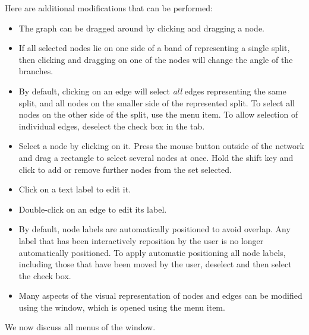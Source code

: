 \documentclass[11pt]{article}
\begin{document}
Here are additional modifications that can be performed:
\begin{itemize}
\item The graph can be dragged around by clicking and dragging a node.
\item If all selected nodes lie on one side of a band of
 representing a single split, then clicking and
dragging on one of the nodes will change
the angle of the branches.
\item
By default, clicking on an edge will select {\em all}
edges representing the same
split, and all nodes on the smaller side of the represented split.
To select all nodes on the other side of the split,
use the  menu item.
To allow selection of individual edges,
deselect the  check box in the
 tab.
\item Select a node by clicking on it. Press the mouse button
  outside of the network and drag  a
rectangle to select several nodes at once. Hold the shift key and click to add
or remove further nodes from the set selected.
\item Click on a text label to edit it.
\item Double-click on an edge to edit its label.
\item By default, node labels are automatically positioned to avoid overlap.  Any label that has been interactively reposition by the user is no longer automatically positioned.
To apply automatic positioning all node labels, including those that have been
moved by the user, deselect and then select
the  check box.
\item Many aspects of the visual representation of nodes and edges can be
modified
using the  window, which is opened using the
 menu item.
\end{itemize}


We now discuss all menus of the  window.

\end{document}
